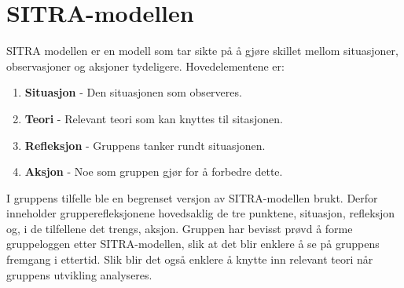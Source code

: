 \section{SITRA-modellen}
SITRA modellen er en modell som tar sikte på å gjøre skillet mellom situasjoner, observasjoner og aksjoner tydeligere.
Hovedelementene er:

\begin{enumerate}
  \item \textbf{Situasjon} - Den situasjonen som observeres.
  \item \textbf{Teori} - Relevant teori som kan knyttes til sitasjonen.
  \item \textbf{Refleksjon} - Gruppens tanker rundt situasjonen.
  \item \textbf{Aksjon} - Noe som gruppen gjør for å forbedre dette. 
\end{enumerate}

I gruppens tilfelle ble en begrenset versjon av SITRA-modellen brukt. 
Derfor inneholder grupperefleksjonene hovedsaklig de tre punktene, situasjon, refleksjon og, i de tilfellene det trengs, aksjon.
Gruppen har bevisst prøvd å forme gruppeloggen etter SITRA-modellen, slik at det blir enklere å se på gruppens fremgang i ettertid. 
Slik blir det også enklere å knytte inn relevant teori når gruppens utvikling analyseres. 